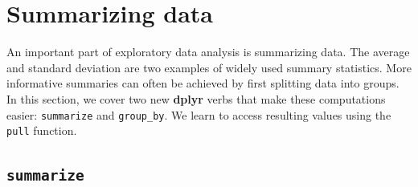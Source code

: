 \documentclass[
]{krantz}
\newenvironment{Shaded}{\begin{snugshade}}{\end{snugshade}}
\newcommand{\DataTypeTok}[1]{\textcolor[rgb]{0.27,0.27,0.27}{#1}}
\newcommand{\DecValTok}[1]{\textcolor[rgb]{0.06,0.06,0.06}{#1}}
\newcommand{\KeywordTok}[1]{\textcolor[rgb]{0.27,0.27,0.27}{\textbf{#1}}}
\newcommand{\NormalTok}[1]{#1}
\newcommand{\OperatorTok}[1]{\textcolor[rgb]{0.43,0.43,0.43}{\textbf{#1}}}
\newcommand{\StringTok}[1]{\textcolor[rgb]{0.5,0.5,0.5}{#1}}
\begin{document}
\begin{Shaded}
\end{Shaded}

\begin{Shaded}
\end{Shaded}

\hypertarget{summarizing-data}{%
\section{Summarizing data}\label{summarizing-data}}

An important part of exploratory data analysis is summarizing data. The average and standard deviation are two examples of widely used summary statistics. More informative summaries can often be achieved by first splitting data into groups. In this section, we cover two new \textbf{dplyr} verbs that make these computations easier: \texttt{summarize} and \texttt{group\_by}. We learn to access resulting values using the \texttt{pull} function.

\hypertarget{summarize}{%
\subsection{\texorpdfstring{\texttt{summarize}}{summarize}}\label{summarize}}
\end{document}
